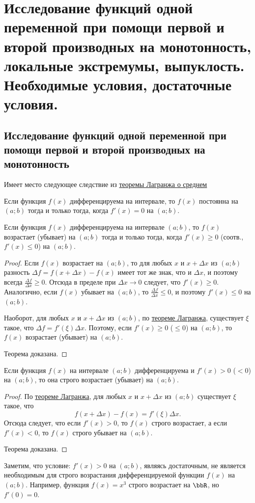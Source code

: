 \chapter{Исследование функций одной переменной при помощи первой и второй производных на монотонность, локальные экстремумы, выпуклость. Необходимые условия, достаточные условия.}

\section{Исследование функций одной переменной при помощи первой и второй производных на монотонность}

Имеет место следующее следствие из \hyperref[ch4t1]{теоремы Лагранжа о среднем}
\begin{thm}
Если функция $f(x)$ дифференцируема на интервале, то $f(x)$ постоянна на $(a;b)$ тогда и только тогда, когда $f'(x)=0$ на $(a;b)$.
\end{thm}
 
\begin{thm} Если функция $f(x)$ дифференцируема на интервале $(a;b)$, то $f(x)$ возрастает (убывает) на $(a;b)$ тогда и только тогда, когда $f'(x)\ge 0$ (соотв., $f'(x)\le 0$) на $(a;b)$.
\end{thm}
\begin{proof} Если $f(x)$ возрастает на $(a;b)$, то для любых $x$ и $x+\Delta x$ из $(a;b)$ разность $\Delta f = f(x+\Delta x) - f(x)$ имеет тот же знак, что и $\Delta x$, и поэтому всегда $\frac{\Delta f}{\Delta x} \ge 0$. Отсюда в пределе при $\Delta x \to 0$ следует, что $f'(x) \ge 0$. Аналогично, если $f(x)$ убывает на $(a;b)$, то $\frac{\Delta f}{\Delta x} \le 0$, и поэтому $f'(x) \le 0$ на $(a;b)$.

    Наоборот, для любых $x$ и $x + \Delta x$ из $(a;b)$, по \hyperref[ch4t1]{теореме Лагранжа}, существует $\xi$ такое, что $\Delta f = f'(\xi)\Delta x$. Поэтому, если $f'(x) \ge 0$ ($\le 0$) на $(a;b)$, то $f(x)$ возрастает (убывает) на $(a;b)$.

Теорема доказана.
\end{proof}

\begin{thm}  Если функция $f(x)$ на интервале $(a;b)$ дифференцируема и $f'(x) > 0$ ($< 0$) на $(a;b)$, то она строго возрастает (убывает) на $(a;b)$.
\end{thm}
\begin{proof}
    По \hyperref[ch4t1]{теореме Лагранжа}, для любых $x$ и $x + \Delta x$ из $(a; b)$ существует $\xi$ такое, что
$$
f(x+\Delta x)-f(x)=f'(\xi)\Delta x.
$$
Отсюда следует, что если $f'(x) > 0$, то $f(x)$ строго возрастает, а если $f'(x) < 0$, то $f(x)$ строго убывает на $(a;b)$. 

Теорема доказана.
\end{proof}
Заметим, что условие: $f'(x) > 0$ на $(a;b)$, являясь достаточным, не является необходимым для строго возрастания дифференцируемой функции $f(x)$ на $(a;b)$. Например, функция $f(x) = x^3$ строго возрастает на $\bbR$, но $f'(0) = 0$.

